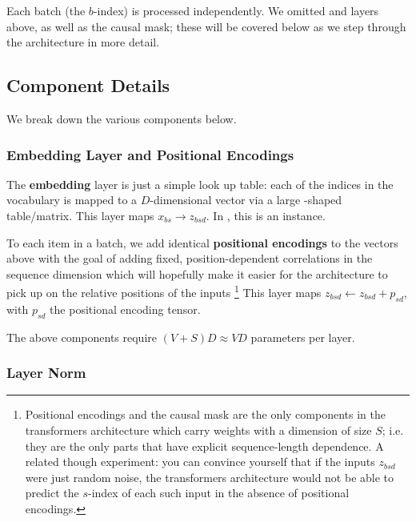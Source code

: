 \documentclass[11pt]{article}
\begin{document}
Each batch (the $ b $-index) is processed independently. We omitted  and
 layers above, as well as the causal mask; these will be covered below as we step
through the architecture in more detail.


\subsection{Component Details \label{subsec_decoder_only_components} }

We break down the various components below.

\subsubsection{Embedding Layer and Positional Encodings \label{subsubsec_embedding_and_pe} }

The \textbf{embedding} layer is just a simple look up table: each of the  indices
in the vocabulary is mapped to a $ D $-dimensional vector via a large -shaped
table/matrix. This layer maps $ x _{ bs } \longrightarrow z _{ bsd } $. In , this is
an  instance.

To each item in a batch, we add identical \textbf{positional encodings} to the vectors above with
the goal of adding fixed, position-dependent correlations in the sequence dimension which will
hopefully make it easier for the architecture to pick up on the relative positions of the inputs
\footnote{Positional encodings and the causal mask are the only components in the transformers
architecture which carry weights with a dimension of size $ S $; i.e. they are the only parts that
have explicit sequence-length dependence. A related though experiment: you can convince yourself
that if the inputs $ z_{ bsd } $
were just random noise, the transformers architecture would not be able to predict
the $ s $-index of each such input in the absence of positional encodings. } This layer maps $ z _{
bsd} \leftarrow z _{ bsd } + p _{ sd } $, with $ p _{ sd } $ the positional encoding tensor.

The above components require $ (V+S)D \approx VD $ parameters per layer.



\subsubsection{Layer Norm \label{subsubsec_layer_norm} }
\end{document}
